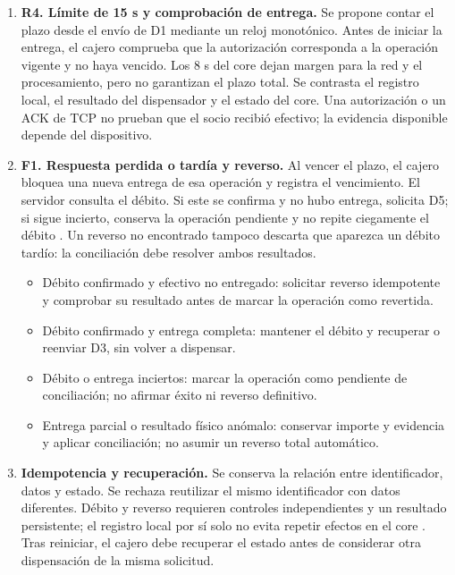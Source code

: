\documentclass[12pt,a4paper]{article}
\begin{document}
\begin{enumerate}
    \item \textbf{R4. Límite de 15 s y comprobación de entrega.}
    Se propone contar el plazo desde el envío de D1 mediante un reloj monotónico. Antes de iniciar la entrega, el cajero comprueba que la autorización corresponda a la operación vigente y no haya vencido. Los 8 s del core dejan margen para la red y el procesamiento, pero no garantizan el plazo total. Se contrasta el registro local, el resultado del dispensador y el estado del core. Una autorización o un ACK de TCP no prueban que el socio recibió efectivo; la evidencia disponible depende del dispositivo.

    \item \textbf{F1. Respuesta perdida o tardía y reverso.}
    Al vencer el plazo, el cajero bloquea una nueva entrega de esa operación y registra el vencimiento. El servidor consulta el débito. Si este se confirma y no hubo entrega, solicita D5; si sigue incierto, conserva la operación pendiente y no repite ciegamente el débito \cite{featonbyretries}. Un reverso no encontrado tampoco descarta que aparezca un débito tardío: la conciliación debe resolver ambos resultados.
    \begin{itemize}
        \item Débito confirmado y efectivo no entregado: solicitar reverso idempotente y comprobar su resultado antes de marcar la operación como revertida.
        \item Débito confirmado y entrega completa: mantener el débito y recuperar o reenviar D3, sin volver a dispensar.
        \item Débito o entrega inciertos: marcar la operación como pendiente de conciliación; no afirmar éxito ni reverso definitivo.
        \item Entrega parcial o resultado físico anómalo: conservar importe y evidencia y aplicar conciliación; no asumir un reverso total automático.
    \end{itemize}

    \item \textbf{Idempotencia y recuperación.}
    Se conserva la relación entre identificador, datos y estado. Se rechaza reutilizar el mismo identificador con datos diferentes. Débito y reverso requieren controles independientes y un resultado persistente; el registro local por sí solo no evita repetir efectos en el core \cite{featonbyretries}. Tras reiniciar, el cajero debe recuperar el estado antes de considerar otra dispensación de la misma solicitud.


\end{enumerate}
\end{document}
